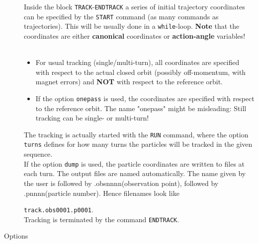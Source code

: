 \begin{description}
          Inside the block \texttt{TRACK}-\texttt{ENDTRACK} a series 
          of initial trajectory coordinates can be specified by the \texttt{START} 
          command (as many commands as trajectories). This will be usually done in a 
          \texttt{while}-loop. \textbf{Note} that the coordinates are either 
          \textbf{canonical} coordinates or \textbf{action-angle} variables!
\\
\\
\begin{itemize}
	\item 
                For usual tracking (single/multi-turn), all coordinates are specified with respect to the actual closed 
                orbit (possibly off-momentum, with magnet errors) and \textbf{NOT} with respect 
                to the reference orbit.
	\item 

                If the option \texttt{onepass} is used, the coordinates are specified with respect 
                to the reference orbit. The name "onepass" might be misleading: Still tracking can be single- or multi-turn!  
                
\end{itemize}
             
             The tracking is actually started with the \texttt{RUN} command, where the option 
             \texttt{turns} defines for how many turns the particles will be tracked in the 
             given sequence.
\\ 
          
          If the option \texttt{dump} is used, the particle coordinates are written
          to files at each turn. The output files are named automatically. The name given by the user is followed 
          by .obsnnnn(observation point), followed by .pnnnn(particle number). Hence filenames look like 
          
\texttt{track.obs0001.p0001}. 
\\
          Tracking is terminated by the command \texttt{ENDTRACK}.
        
	\item[Options] 
	\text{ \\}	
	

\end{description}
